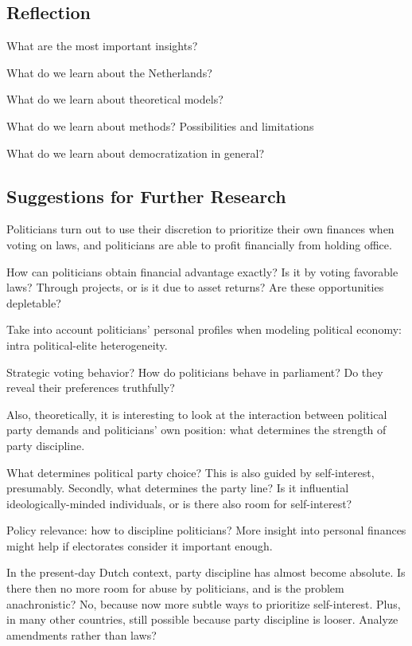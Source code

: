 \subsection{Reflection}

What are the most important insights?

What do we learn about the Netherlands?

What do we learn about theoretical models?

What do we learn about methods? Possibilities and limitations

What do we learn about democratization in general?


\subsection{Suggestions for Further Research}


Politicians turn out to use their discretion to prioritize their own finances when voting on laws, and politicians are able to profit financially from holding office. 

How can politicians obtain financial advantage exactly? Is it by voting favorable laws? Through projects, or is it due to asset returns? Are these opportunities depletable?

Take into account politicians' personal profiles when modeling political economy: intra political-elite heterogeneity.

Strategic voting behavior? How do politicians behave in parliament? Do they reveal their preferences truthfully?

Also, theoretically, it is interesting to look at the interaction between political party demands and politicians' own position: what determines the strength of party discipline.

What determines political party choice? This is also guided by self-interest, presumably. Secondly, what determines the party line? Is it influential ideologically-minded individuals, or is there also room for self-interest?


Policy relevance: how to discipline politicians? More insight into personal finances might help if electorates consider it important enough. 

In the present-day Dutch context, party discipline has almost become absolute. Is there then no more room for abuse by politicians, and is the problem anachronistic? No, because now more subtle ways to prioritize self-interest. Plus, in many other countries, still possible because party discipline is looser. Analyze amendments rather than laws?



\clearpage




